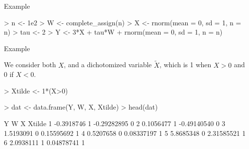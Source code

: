 \documentclass[xcolor={dvipsnames},handout]{beamer}
\begin{document}
\begin{frame}[fragile]{Example}

\scriptsize
\begin{Schunk}
\begin{Sinput}
> n <- 1e2
> W <- complete_assign(n)
> X <- rnorm(mean = 0, sd = 1, n = n)
> tau <- 2
> Y <- 3*X + tau*W + rnorm(mean = 0, sd = 1, n = n)
\end{Sinput}
\end{Schunk}


\end{frame}



\begin{frame}[fragile]{Example}

We consider both $X$, and a dichotomized variable $\tilde X$, which is 1 when $X>0$ and 0 if $X<0$.

\scriptsize
\begin{Schunk}
\begin{Sinput}
> Xtilde <- 1*(X>0)
\end{Sinput}
\end{Schunk}



\begin{Schunk}
\begin{Sinput}
> dat <- data.frame(Y, W, X, Xtilde)
> head(dat)
\end{Sinput}
\begin{Soutput}
           Y W           X Xtilde
1 -0.3918746 1 -0.29282895      0
2  0.1056477 1 -0.49140540      0
3  1.5193091 0  0.15595692      1
4  0.5207658 0  0.08337197      1
5  5.8685348 0  2.31585521      1
6  2.0938111 1  0.04878741      1
\end{Soutput}
\end{Schunk}

\end{frame}


\end{document}

